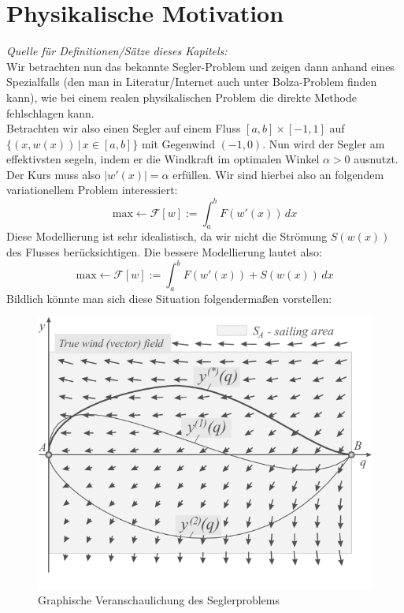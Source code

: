 \section{Physikalische Motivation}
\textit{Quelle für Definitionen/Sätze dieses Kapitels: \cite{CalcVarBSchmidt}}\\[0.1cm]
Wir betrachten nun das bekannte Segler-Problem und zeigen dann anhand eines Spezialfalls (den man in Literatur/Internet auch unter Bolza-Problem finden kann), wie bei einem realen physikalischen Problem die direkte Methode fehlschlagen kann.\\
Betrachten wir also einen Segler auf einem Fluss \([a,b] \times [-1,1]\) auf \(\{(x,w(x))\, | \, x \in [a,b]\}\) mit Gegenwind \((-1,0)\). Nun wird der Segler am effektivsten segeln, indem er die Windkraft im optimalen Winkel \(\alpha > 0\) ausnutzt. Der Kurs muss also \(|w'(x)|=\alpha\) erfüllen. Wir sind hierbei also an folgendem variationellem Problem interessiert:
\begin{equation}
    \text{max} \leftarrow \mathcal{F}[w]:=\int_{a}^b F(w'(x)) \,dx 
\end{equation}
Diese Modellierung ist sehr idealistisch, da wir nicht die Strömung \(S(w(x))\) des Flusses berücksichtigen. Die bessere Modellierung lautet also:
\begin{equation}
    \text{max} \leftarrow \mathcal{F}[w]:=\int_{a}^b F(w'(x)) + S(w(x))\, dx
\end{equation}
Bildlich könnte man sich diese Situation folgendermaßen vorstellen:
\begin{figure}[!h]
    \centering
    \includegraphics[scale=0.42]{figures/Sailboat-trajectory.png}
    \caption{Graphische Veranschaulichung des Seglerproblems\cite{Sailboat}}
    \label{fig:sail}
\end{figure}\\

